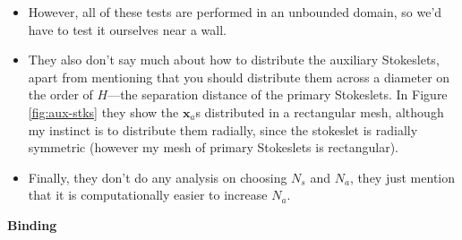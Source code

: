 \documentclass{article}
\newcommand{\vect}[1]{\boldsymbol{\mathbf{#1}}}
\begin{document}
\begin{itemize}
\item However, all of these tests are performed in an unbounded
  domain, so we'd have to test it ourselves near a wall.
\item They also don't say much about how to distribute the auxiliary
  Stokeslets, apart from mentioning that you should distribute them
  across a diameter on the order of $H$---the separation distance of
  the primary Stokeslets. In Figure \ref{fig:aux-stks} they show the
  $\vect{x}_a$s distributed in a rectangular mesh, although my
  instinct is to distribute them radially, since the stokeslet is
  radially symmetric (however my mesh of primary Stokeslets is
  rectangular).
\item Finally, they don't do any analysis on choosing $N_s$ and $N_a$,
  they just mention that it is computationally easier to increase $N_a$.
\end{itemize}

\textbf{Binding}
\end{document}
